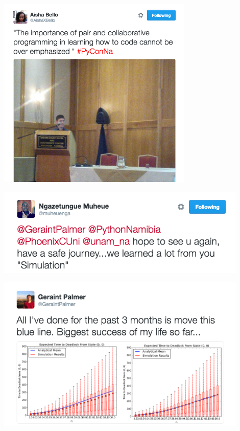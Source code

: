 \documentclass{beamer}
\begin{document}
\begin{frame}
  \begin{center}
  \href{https://twitter.com/AishaXBello/status/692267117614362625}{\includegraphics[width=0.7\textwidth]{tweets/pyconna_1}}
  \end{center}
\end{frame}

\begin{frame}
  \begin{center}
  \href{https://twitter.com/muheuenga/status/693380281340968960}{\includegraphics[width=0.9\textwidth]{tweets/pyconna_3}}
  \end{center}
\end{frame}

\begin{frame}
  \begin{center}
  \href{https://twitter.com/GeraintPalmer/status/623530377932578816}{\includegraphics[width=0.9\textwidth]{tweets/deadlock_move_line}}
  \end{center}
\end{frame}
\end{document}
